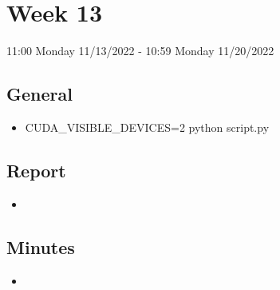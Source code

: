\documentclass{article}
\begin{document}
\pagebreak

\section*{Week 13}
11:00 Monday 11/13/2022 - 10:59 Monday 11/20/2022

\subsection*{General}
\begin{itemize}
	\item CUDA\_VISIBLE\_DEVICES=2 python script.py
\end{itemize}

\subsection*{Report}
\begin{itemize}
	\item 
\end{itemize}

\subsection*{Minutes}
\begin{itemize}
	\item 
\end{itemize}

\pagebreak
\end{document}
